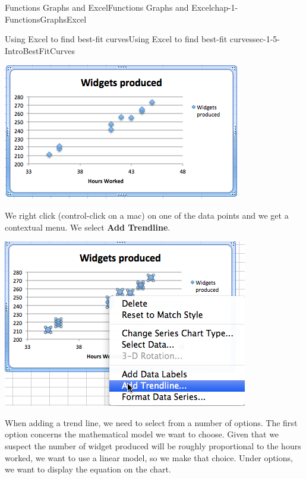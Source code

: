 \documentclass[oneside,10pt,]{book}
\newcommand{\terminology}[1]{\textbf{#1}}
\numberwithin{equation}{section}
\begin{document}
\begin{chapterptx}{Functions Graphs and Excel}{}{Functions Graphs and Excel}{}{}{chap-1-FunctionsGraphsExcel}
\begin{sectionptx}{Using Excel to find best-fit curves}{}{Using Excel to find best-fit curves}{}{}{sec-1-5-IntroBestFitCurves}
\begin{sidebyside}{1}{0.1}{0.1}{0}%
\begin{sbspanel}{0.8}%
\includegraphics[width=1\linewidth]{images/sec1-5-2.png}
\end{sbspanel}%
\end{sidebyside}%
%
\par
\hypertarget{p-380}{}%
We right click (control-click on a mac) on one of the data points and we get a contextual menu.  We select \terminology{Add Trendline}. \begin{sidebyside}{1}{0.1}{0.1}{0}%
\begin{sbspanel}{0.8}%
\includegraphics[width=1\linewidth]{images/sec1-5-3.png}
\end{sbspanel}%
\end{sidebyside}%
%
\par
\hypertarget{p-381}{}%
When adding a trend line, we need to select from a number of options.  The first option concerns the mathematical model we want to choose.  Given that we suspect the number of widget produced will be roughly proportional to the hours worked, we want to use a linear model, so we make that choice.  Under options, we want to display the equation on the chart. \leavevmode%

\end{sectionptx}
\end{chapterptx}
\end{document}
